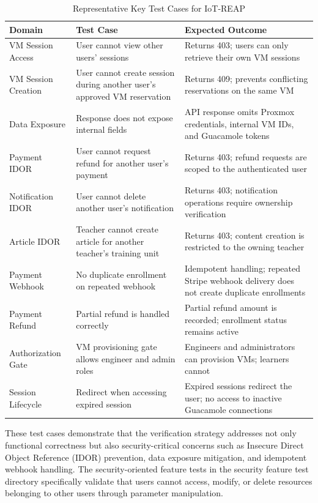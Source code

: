 \begin{table}[H]
\centering
\caption{Representative Key Test Cases for IoT-REAP}
\label{tab:key-test-cases}
\begin{tabular}{|p{3.5cm}|p{5.5cm}|p{5.5cm}|}
\hline
\textbf{Domain} & \textbf{Test Case} & \textbf{Expected Outcome} \\
\hline
VM Session Access & User cannot view other users' sessions & Returns 403; users can only retrieve their own VM sessions \\
\hline
VM Session Creation & User cannot create session during another user's approved VM reservation & Returns 409; prevents conflicting reservations on the same VM \\
\hline
Data Exposure & Response does not expose internal fields & API response omits Proxmox credentials, internal VM IDs, and Guacamole tokens \\
\hline
Payment IDOR & User cannot request refund for another user's payment & Returns 403; refund requests are scoped to the authenticated user \\
\hline
Notification IDOR & User cannot delete another user's notification & Returns 403; notification operations require ownership verification \\
\hline
Article IDOR & Teacher cannot create article for another teacher's training unit & Returns 403; content creation is restricted to the owning teacher \\
\hline
Payment Webhook & No duplicate enrollment on repeated webhook & Idempotent handling; repeated Stripe webhook delivery does not create duplicate enrollments \\
\hline
Payment Refund & Partial refund is handled correctly & Partial refund amount is recorded; enrollment status remains active \\
\hline
Authorization Gate & VM provisioning gate allows engineer and admin roles & Engineers and administrators can provision VMs; learners cannot \\
\hline
Session Lifecycle & Redirect when accessing expired session & Expired sessions redirect the user; no access to inactive Guacamole connections \\
\hline
\end{tabular}
\end{table}

These test cases demonstrate that the verification strategy addresses not only functional correctness but also security-critical concerns such as Insecure Direct Object Reference (IDOR) prevention, data exposure mitigation, and idempotent webhook handling. The security-oriented feature tests in the security feature test directory specifically validate that users cannot access, modify, or delete resources belonging to other users through parameter manipulation.

